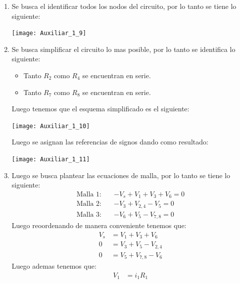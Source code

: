 \documentclass[
  11pt,
  letterpaper,
   addpoints,
   answers
  ]{exam}
\begin{document}
\begin{solution}
    \begin{enumerate}
        \item Se busca el identificar todos los nodos del circuito, por lo tanto se tiene lo siguiente:
        \begin{center}
            \texttt{[image: Auxiliar\_1\_9]}
        \end{center}
        \item Se busca simplificar el circuito lo mas posible, por lo tanto se identifica lo siguiente:
        \begin{itemize}
            \item Tanto $R_2$ como $R_4$ se encuentran en serie.
            \item Tanto $R_7$ como $R_8$ se encuentran en serie.
        \end{itemize}
        Luego tenemos que el esquema simplificado es el siguiente:
    \begin{center}
        \texttt{[image: Auxiliar\_1\_10]}
    \end{center}
    Luego se asignan las referencias de signos dando como resultado:
    \begin{center}
        \texttt{[image: Auxiliar\_1\_11]}
    \end{center}
    \item Luego se busca plantear las ecuaciones de malla, por lo tanto se tiene lo siguiente:
    \begin{align}
        \text{Malla 1:} \quad & -V_s + V_1 + V_3 + V_6 = 0 \\
        \text{Malla 2:} \quad & - V_3 + V_{2,4} - V_5 = 0 \\
        \text{Malla 3:} \quad & -V_6 + V_5 - V_{7,8} = 0 
    \end{align}
    Luego reoordenando de manera conveniente tenemos que:
    \begin{align}
        V_s &= V_1 + V_3 + V_6 \\
        0 &= V_3 + V_5 - V_{2,4} \\
        0 &= V_5 + V_{7,8} - V_6 
    \end{align}
    Luego ademas tenemos que:
    \begin{align}
        V_1 &= i_1 R_1 \\

\end{align}
\end{enumerate}
\end{solution}
\end{document}
